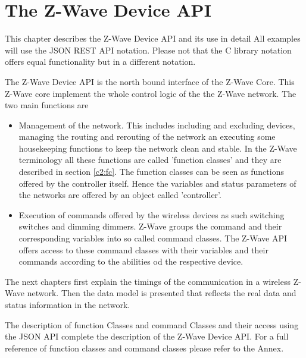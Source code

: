 \chapter{The Z-Wave Device API}
\label{c2}

This chapter describes the Z-Wave Device API and its use in detail All examples will use
the JSON REST API notation. Please not that the C library notation offers equal 
functionality but in a different notation.

The Z-Wave Device API is the north bound interface of the Z-Wave Core. This Z-Wave core
implement the whole control logic of the the Z-Wave network. The two main functions are
\begin{itemize}
\item Management of the network. This includes including and excluding devices, managing 
the routing and rerouting of the network  an executing some housekeeping functions 
to keep the network clean and stable. In the Z-Wave terminology all these functions 
are called 'function classes' and they are described in section \ref{c2:fc}. The function 
classes can be seen as functions offered by the controller itself. Hence the variables
and status parameters of the networks are offered by an object called 'controller'.

\item Execution of commands offered by the wireless devices as such switching switches 
and dimming dimmers. Z-Wave groups the command and their corresponding variables into
so called command classes. The Z-Wave API offers access to these command classes with
their variables and their commands according to the abilities od the respective device.
\end{itemize}
The next chapters first explain the timings of the communication in a wireless 
Z-Wave network. Then the data model is presented that reflects the real data and status 
information in the network.

The description of function Classes and command Classes and their access 
using the JSON API  complete the description of the Z-Wave Device API. For a full 
reference of function classes and command classes please refer to the Annex. 